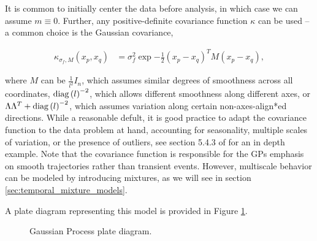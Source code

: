 \documentclass{article}
\begin{document}
It is common to initially center the data before analysis, in which case we can
assume $m \equiv 0$. Further, any positive-definite covariance function $\kappa$
can be used -- a common choice is the Gaussian covariance,

\begin{align*}
\kappa_{\sigma_{f}, M}\left(x_{p}, x_{q}\right) &= \sigma_{f}^{2}\exp{-\frac{1}{2}\left(x_{p} - x_{q}\right)^{T}M\left(x_{p} - x_{q}\right)},
\end{align*}

where $M$ can be $\frac{1}{l^{2}}I_{n}$, which assumes similar degrees of smoothness
across all coordinates, $\mathop\mathrm{diag}\left(l\right)^{-2}$, which allows different
smoothness along different axes, or $\Lambda \Lambda^{T} + \mathop\mathrm{diag}\left(l\right)^{-2}$,
which assumes variation along certain non-axes-align*ed directions. While a
reasonable defult, it is good practice to adapt the covariance function to the
data problem at hand, accounting for seasonality, multiple scales of variation,
or the presence of outliers, see section 5.4.3 of \citep{rasmussen2006gaussian}
for an in depth example. Note that the covariance function is responsible for
the GPs emphasis on smooth trajectories rather than transient events. However,
multiscale behavior can be modeled by introducing mixtures, as we will see in
section \ref{sec:temporal_mixture_models}.

A plate diagram representing this model is provided in Figure \ref{fig:gp_plate}.

\begin{figure}[ht]
  \centering

  \caption{Gaussian Process plate diagram.\label{fig:gp_plate} }
\end{figure}
\end{document}
